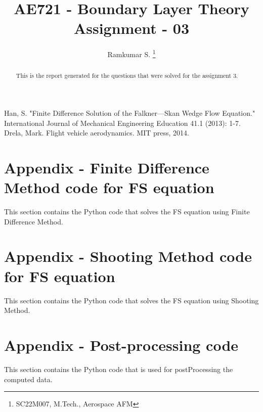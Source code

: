 \documentclass[conf]{new-aiaa}
\title{AE721 - Boundary Layer Theory \\ Assignment - 03}
\author{Ramkumar S. \footnote{SC22M007, M.Tech., Aerospace AFM }}
\affil{SC22M007, M.Tech. Aerospace - Aerodynamics and Flight Mechanics}
\begin{document}
\maketitle

\begin{abstract}
    This is the report generated for the questions that were solved for the
    assignment 3.
\end{abstract}








\begin{thebibliography}{2}
      Han, S. "Finite Difference Solution of the Falkner—Skan Wedge Flow Equation." International Journal of Mechanical Engineering Education 41.1 (2013): 1-7.
     Drela, Mark. Flight vehicle aerodynamics. MIT press, 2014.

\end{thebibliography}

\pagebreak

\begin{appendices}

    \section{Appendix - Finite Difference Method code for FS equation}\label{FDM_code}
    This section contains the Python code that solves the FS equation using
    Finite Difference Method.
    

    \section{Appendix - Shooting Method code for FS equation}\label{SH_code}
    This section contains the Python code that solves the FS equation using
    Shooting Method.
    

    \section{Appendix - Post-processing code}\label{pp_code}
    This section contains the Python code that is used for postProcessing the computed data.
    

\end{appendices}

\par
\center{**********}
\end{document}
